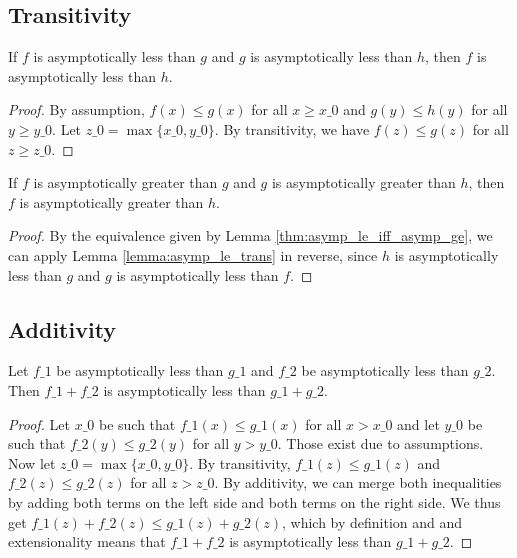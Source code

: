 \subsection{Transitivity}

\begin{lemma}
    \label{lemma:asymp_le_trans}
    \leanok
    If $f$ is asymptotically less than $g$ and $g$ is asymptotically less than $h$,
    then $f$ is asymptotically less than $h$.
\end{lemma}

\begin{proof}
    \leanok
    By assumption, $f(x) \le g(x)$ for all $x \ge x\_0$ and $g(y) \le h(y)$ for all
    $y \ge y\_0$. Let $z\_0 = \max \{ x\_0, y\_0 \}$. By transitivity, we have 
    $f(z) \le g(z)$ for all $z \ge z\_0$.
\end{proof}

\begin{lemma}
    \label{lemma:asymp_ge_trans}
    \leanok
    If $f$ is asymptotically greater than $g$ and $g$ is asymptotically greater than $h$,
    then $f$ is asymptotically greater than $h$.
\end{lemma}

\begin{proof}
    \leanok
    By the equivalence given by Lemma \ref{thm:asymp_le_iff_asymp_ge}, we can apply
    Lemma \ref{lemma:asymp_le_trans} in reverse, since $h$ is asymptotically less than
    $g$ and $g$ is asymptotically less than $f$.
\end{proof}


\subsection{Additivity}

\begin{lemma}
    \label{lemma:asymp_le_add}
    \leanok
    Let $f\_1$ be asymptotically less than $g\_1$ and $f\_2$ be asymptotically less
    than $g\_2$. Then $f\_1 + f\_2$ is asymptotically less than $g\_1 + g\_2$.
\end{lemma}

\begin{proof}
    \leanok
    Let $x\_0$ be such that $f\_1(x) \le g\_1(x)$ for all $x > x\_0$ and let $y\_0$ be
    such that $f\_2(y) \le g\_2(y)$ for all $y > y\_0$. Those exist due to assumptions.
    Now let $z\_0 = \max \{ x\_0, y\_0 \}$. By transitivity, $f\_1(z) \le g\_1(z)$ and 
    $f\_2(z) \le g\_2(z)$ for all $z > z\_0$. By additivity, we can merge both 
    inequalities by adding both terms on the left side and both terms on the right side.
    We thus get $f\_1(z) + f\_2(z) \le g\_1(z) + g\_2(z)$, which by definition and 
    and extensionality means that $f\_1 + f\_2$ is asymptotically less than $g\_1 + g\_2$.
\end{proof}

